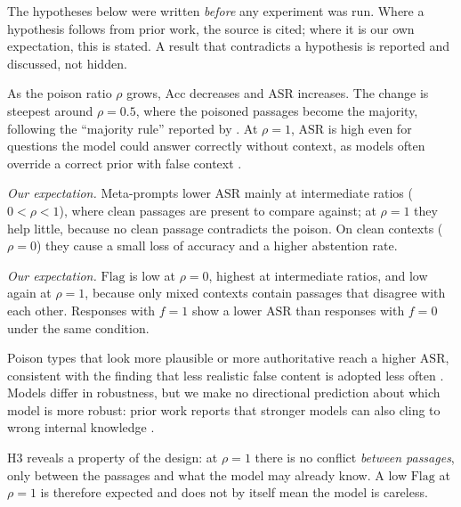 \documentclass[11pt,a4paper]{report}
\begin{document}
The hypotheses below were written \emph{before} any experiment was run.
Where a hypothesis follows from prior work, the source is cited; where it
is our own expectation, this is stated. A result that contradicts a
hypothesis is reported and discussed, not hidden.

\begin{description}[leftmargin=0pt]
  \item[H1 (for RQ1).] As the poison ratio $\rho$ grows, $\mathrm{Acc}$
    decreases and $\mathrm{ASR}$ increases. The change is steepest around
    $\rho = 0.5$, where the poisoned passages become the majority,
    following the ``majority rule'' reported by \citet{jin2024tugofwar}.
    At $\rho = 1$, $\mathrm{ASR}$ is high even for questions the model
    could answer correctly without context, as models often override a
    correct prior with false context \citep{wu2024clasheval}.

  \item[H2 (for RQ2).] \emph{Our expectation.} Meta-prompts lower
    $\mathrm{ASR}$ mainly at intermediate ratios ($0 < \rho < 1$), where
    clean passages are present to compare against; at $\rho = 1$ they
    help little, because no clean passage contradicts the poison. On clean
    contexts ($\rho = 0$) they cause a small loss of accuracy and a higher
    abstention rate.

  \item[H3 (for RQ3).] \emph{Our expectation.} $\mathrm{Flag}$ is low at
    $\rho = 0$, highest at intermediate ratios, and low again at
    $\rho = 1$, because only mixed contexts contain passages that disagree
    with each other. Responses with $f = 1$ show a lower $\mathrm{ASR}$
    than responses with $f = 0$ under the same condition.

  \item[H4 (for RQ4).] Poison types that look more plausible or more
    authoritative reach a higher $\mathrm{ASR}$, consistent with the
    finding that less realistic false content is adopted less often
    \citep{wu2024clasheval}. Models differ in robustness, but we make no
    directional prediction about which model is more robust: prior work
    reports that stronger models can also cling to wrong internal
    knowledge \citep{jin2024tugofwar}.
\end{description}

\begin{notebox}
H3 reveals a property of the design: at $\rho = 1$ there is no conflict
\emph{between passages}, only between the passages and what the model may
already know. A low $\mathrm{Flag}$ at $\rho = 1$ is therefore expected and
does not by itself mean the model is careless.
\end{notebox}
\end{document}
